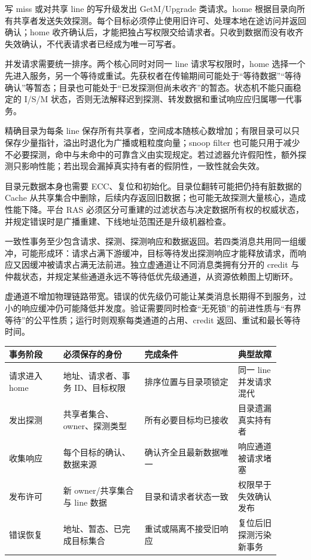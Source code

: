 写 miss 或对共享 line 的写升级发出 GetM/Upgrade 类请求。home 根据目录向所有共享者发送失效探测。每个目标必须停止使用旧许可、处理本地在途访问并返回确认；home 收齐确认后，才能把独占写权限交给请求者。只收到数据而没有收齐失效确认，不代表请求者已经成为唯一可写者。

并发请求需要统一排序。两个核心同时对同一 line 请求写权限时，home 选择一个先进入服务，另一个等待或重试。先获权者在传输期间可能处于“等待数据”“等待确认”等暂态；目录也可能处于“已发探测但尚未收齐”的暂态。状态机不能只画稳定的 I/S/M 状态，否则无法解释迟到探测、转发数据和重试响应应归属哪一代事务。


精确目录为每条 line 保存所有共享者，空间成本随核心数增加；有限目录可以只保存少量指针，溢出时退化为广播或粗粒度向量；snoop filter 也可能只用于减少不必要探测，命中与未命中的可靠含义由实现规定。若过滤器允许假阳性，额外探测只影响性能；若出现会漏掉真实持有者的假阴性，一致性就会失效。

目录元数据本身也需要 ECC、复位和初始化。目录位翻转可能把仍持有脏数据的 Cache 从共享集合中删除，后续内存返回旧数据；也可能无故探测大量核心，造成性能下降。平台 RAS 必须区分可重建的过滤状态与决定数据所有权的权威状态，并规定错误时是广播重建、下线地址范围还是升级机器检查。


一致性事务至少包含请求、探测、探测响应和数据返回。若四类消息共用同一组缓冲，可能形成环：请求占满下游缓冲，目标等待发出探测响应才能释放请求，而响应又因缓冲被请求占满无法前进。独立虚通道让不同消息类拥有分开的 credit 与仲裁状态，并规定某些通道永远不等待低优先级通道，从资源依赖图上切断环。

虚通道不增加物理链路带宽。错误的优先级仍可能让某类消息长期得不到服务，过小的响应缓冲仍可能降低并发度。验证需要同时检查“无死锁”的前进性质与“有界等待”的公平性质；运行时则观察每类通道的占用、credit 返回、重试和最长等待时间。

\begin{longtable}{L{0.18\linewidth}L{0.27\linewidth}L{0.31\linewidth}L{0.14\linewidth}}
\toprule
事务阶段 & 必须保存的身份 & 完成条件 & 典型故障 \\
\midrule
请求进入 home & 地址、请求者、事务 ID、目标权限 & 排序位置与目录项锁定 & 同一 line 并发请求混代 \\\tablerowrule
发出探测 & 共享者集合、owner、探测类型 & 所有必要目标均已接收 & 目录遗漏真实持有者 \\\tablerowrule
收集响应 & 每个目标的确认、数据来源 & 确认齐全且最新数据唯一 & 响应通道被请求堵塞 \\\tablerowrule
发布许可 & 新 owner/共享集合与 line 数据 & 目录和请求者状态一致 & 权限早于失效确认发布 \\\tablerowrule
错误恢复 & 地址、暂态、已完成目标集合 & 重试或隔离不接受旧响应 & 复位后旧探测污染新事务 \\
\bottomrule
\end{longtable}

